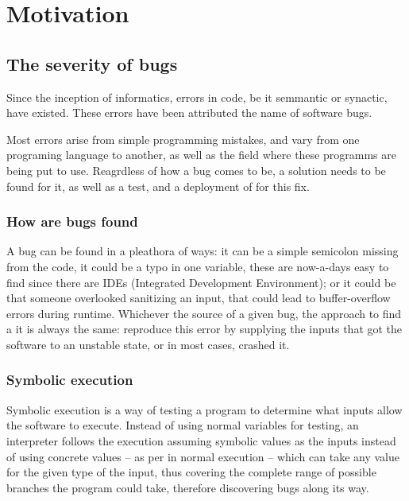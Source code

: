 
\chapter{Motivation}\label{chapter:Motivation}

\section{The severity of bugs}
Since the inception of informatics, errors in code, be it semmantic or synactic, have existed. These errors have been attributed the name of software bugs.

Most errors arise from simple programming mistakes, and vary from one programing language to another, as well as the field where these programms are being put to use. Reagrdless of how a bug comes to be, a solution needs to be found for it, as well as a test, and a deployment of for this fix.

\subsection{How are bugs found}

A bug can be found in a pleathora of ways: it can be a simple semicolon missing from the code, it could be a typo in one variable, these are now-a-days easy to find since there are IDEs (Integrated Development Environment); or it could be that someone overlooked sanitizing an input, that could lead to buffer-overflow errors during runtime. Whichever the source of a given bug, the approach to find a it is always the same: reproduce this error by supplying the inputs that got the software to an unstable state, or in most cases, crashed it.

\subsection{Symbolic execution}

Symbolic execution is a way of testing a program to determine what inputs allow the software to execute. Instead of using normal variables for testing, an interpreter follows the execution assuming symbolic values as the inputs instead of using concrete values -- as per in normal execution -- which can take any value for the given type of the input, thus covering the complete range of possible branches the program could take, therefore discovering bugs along its way.

